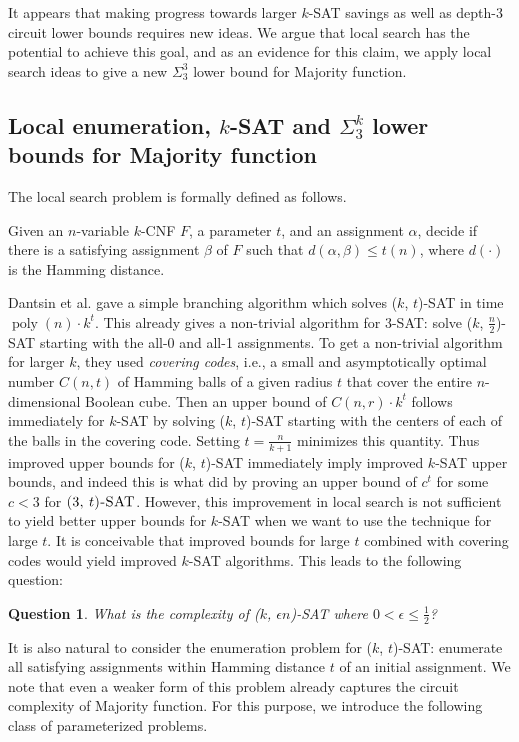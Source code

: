 \documentclass[10pt,a4paper]{article}
\newtheorem{question}{Question}
\newcommand{\poly}{\operatorname{poly}}
\newcommand\ballsat[2]{\textsc{($#1$, $#2$)-SAT}}
\begin{document}
\bigskip
It appears that making progress towards larger $k$-SAT savings as well as depth-3 circuit lower bounds requires new ideas. We argue that local search has the potential to achieve this goal, and as an evidence for this claim, we apply local search ideas to give a new $\Sigma^3_3$ lower bound for Majority function.


\subsection{Local enumeration, $k$-SAT and $\Sigma^k_3$ lower bounds for Majority function}
The local search problem is formally defined as follows.

\bigskip
\noindent{\bf{\ballsat{k}{t}}.} Given an $n$-variable $k$-CNF $F$, a parameter $t$, and an assignment $\alpha$, decide if there is a satisfying assignment $\beta$ of $F$ such that $d(\alpha, \beta) \le t(n)$, where $d(\cdot)$ is the Hamming distance.

\bigskip
Dantsin et al. \cite{DantsinGHKKPRS02} gave a simple branching algorithm which solves \ballsat{k}{t} in time $\poly(n) \cdot k^t$. This already gives a non-trivial algorithm for 3-SAT: solve \ballsat{k}{\frac{n}{2}} 
starting with the all-0  and all-1 assignments. To get a non-trivial algorithm for larger $k$, they used \emph{covering codes}, i.e., a small and asymptotically optimal number $C(n, t)$ of Hamming balls of a given radius $t$ that cover the entire $n$-dimensional Boolean cube. Then an upper bound of $C(n, r)\cdot k^t$ follows immediately for $k$-SAT by solving \ballsat{k}{t} starting with 
the centers of each of the balls in the covering code. Setting $t = \frac{n}{k + 1}$ minimizes this quantity. 
Thus improved upper bounds 
for \ballsat{k}{t} immediately imply 
improved $k$-SAT upper bounds, 
and indeed this is what \cite{BrueggemannK04,KS} did  by
proving an upper bound of $c^t$ for some $c < 3$ for $\ballsat{3}{t}$.
However, this improvement in local search is not
sufficient to yield better upper  
bounds for $k$-SAT when we want to use the technique for large $t$. It is conceivable that improved bounds for large $t$ combined with covering codes would yield improved $k$-SAT algorithms. This leads to the following question:

\begin{question}
What is the complexity of \ballsat{k}{\epsilon n} where $0 < \epsilon \le \frac{1}{2}$?
\end{question}

It is also natural to consider the enumeration problem for \ballsat{k}{t}: 
enumerate all satisfying assignments within Hamming distance $t$ of an 
initial assignment. We note that even a weaker form of this problem 
already captures the circuit complexity of Majority function. For 
this purpose, we introduce the following class of parameterized problems.
\end{document}
